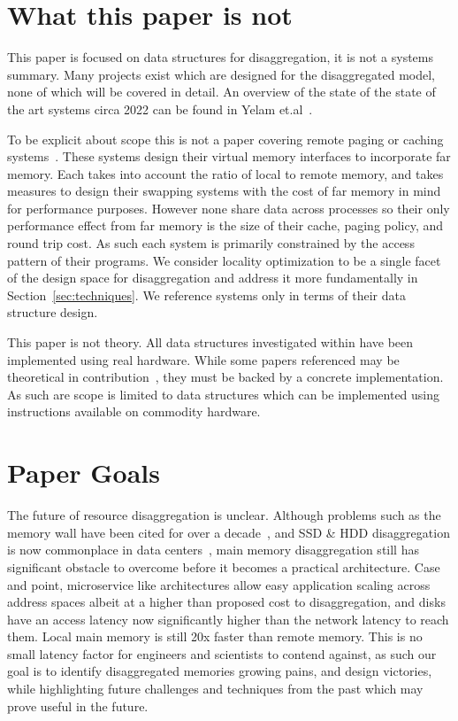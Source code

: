 \section{What this paper is not}

This paper is focused on data structures for disaggregation, it is not a systems
summary.  Many projects exist which are designed for the disaggregated model,
none of which will be covered in detail. An overview of the state of the state
of the art systems circa 2022 can be found in Yelam
et.al~\cite{yelam2022systems}.

To be explicit about scope this is not a paper covering remote paging or caching
systems~\cite{fastswap,kona,infiniswap,leap,legoos}. These systems design their
virtual memory interfaces to incorporate far memory. Each takes into account the
ratio of local to remote memory, and takes measures to design their swapping
systems with the cost of far memory in mind for performance purposes.  However
none share data across processes so their only performance effect from far
memory is the size of their cache, paging policy, and round trip cost. As such
each system is primarily constrained by the access pattern of their programs. We
consider locality optimization to be a single facet of the design space for
disaggregation and address it more fundamentally in
Section~\ref{sec:techniques}. We reference systems only in terms of their data
structure design.

This paper is not theory. All data structures investigated within have been
implemented using real hardware. While some papers referenced may be theoretical
in contribution~\cite{flat-combine,hopscotch,linked-list-cas}, they must be
backed by a concrete implementation. As such are scope is limited to data
structures which can be implemented using instructions available on commodity
hardware.

\section{Paper Goals}

The future of resource disaggregation is unclear. Although problems such as the
memory wall have been cited for over a decade~\cite{blade-server}, and SSD \&
HDD disaggregation is now commonplace in data centers~\cite{decible}, main
memory disaggregation still has significant obstacle to overcome before it
becomes a practical architecture. Case and point, microservice like
architectures allow easy application scaling across address spaces albeit at a
higher than proposed cost to disaggregation, and disks have an access latency
now significantly higher than the network latency to reach them. Local main
memory is still 20x faster than remote memory. This is no small latency factor
for engineers and scientists to contend against, as such our goal is to identify
disaggregated memories growing pains, and design victories, while highlighting
future challenges and techniques from the past which may prove useful in the
future.


